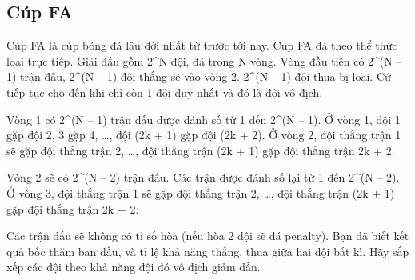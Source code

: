 \subsection{   Cúp FA  }

   Cúp FA là cúp bóng đá lâu đời nhất từ trước tới nay. Cup FA đá theo thể thức loại trực tiếp. Giải đấu gồm 2^N đội, đá trong N vòng. Vòng đầu tiên có 2^(N – 1) trận đấu, 2^(N – 1) đội thắng sẽ vào vòng 2. 2^(N – 1) đội thua bị loại. Cứ tiếp tục cho đến khi chỉ còn 1 đội duy nhất và đó là đội vô địch.  

   Vòng 1 có 2^(N – 1) trận đấu được đánh số từ 1 đến 2^(N – 1). Ở vòng 1, đội 1 gặp đội 2, 3 gặp 4, …, đội (2k + 1) gặp đội (2k + 2). Ở vòng 2, đội thắng trận 1 sẽ gặp đội thắng trận 2, …, đội thắng trận (2k + 1) gặp đội thắng trận 2k + 2.  

   Vòng 2 sẽ có 2^(N – 2) trận đấu. Các trận được đánh số lại từ 1 đến 2^(N – 2). Ở vòng 3, đội thắng trận 1 sẽ gặp đội thắng trận 2, …, đội thắng trận (2k + 1) gặp đội thắng trận 2k + 2.  

   Các trận đấu sẽ không có tỉ số hòa (nếu hòa 2 đội sẽ đá penalty). Bạn đã biết kết quả bốc thăm ban đầu, và tỉ lệ khả năng thắng, thua giữa hai đội bất kì. Hãy sắp xếp các đội theo khả năng đội đó vô địch giảm dần.